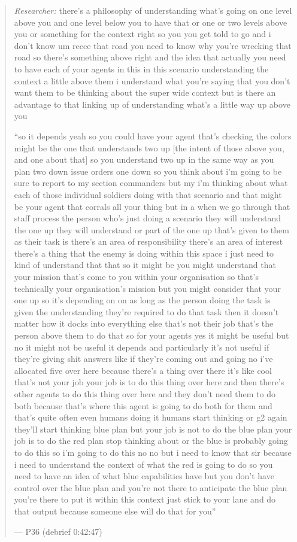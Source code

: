 \begin{quote}\small
{\footnotesize\textit{Researcher:} there's a philosophy of understanding what's going on one level above you and one level below you to have that or one or two levels above you or something for the context right so you you get told to go and i don't know um recce that road you need to know why you're wrecking that road so there's something above right and the idea that actually you need to have each of your agents in this in this scenario understanding the context a little above them i understand what you're saying that you don't want them to be thinking about the super wide context but is there an advantage to that linking up of understanding what's a little way up above you}\par\smallskip
``so it depends yeah so you could have your agent that's checking the colors might be the one that understands two up [the intent of those above you, and one about that] so you understand two up in the same way as you plan two down issue orders one down so you think about i'm going to be sure to report to my section commanders but my i'm thinking about what each of those individual soldiers doing with that scenario and that might be your agent that corrals all your thing but in a when we go through that staff process the person who's just doing a scenario they will understand the one up they will understand or part of the one up that's given to them as their task is there's an area of responsibility there's an area of interest there's a thing that the enemy is doing within this space i just need to kind of understand that that so it might be you might understand that your mission that's come to you within your organisation so that's technically your organisation's mission but you might consider that your one up so it's depending on on as long as the person doing the task is given the understanding they're required to do that task then it doesn't matter how it docks into everything else that's not their job that's the person above them to do that so for your agents yes it might be useful but no it might not be useful it depends and particularly it's not useful if they're giving shit answers like if they're coming out and going no i've allocated five over here because there's a thing over there it's like cool that's not your job your job is to do this thing over here and then there's other agents to do this thing over here and they don't need them to do both because that's where this agent is going to do both for them and that's quite often even humans doing it humans start thinking or g2 again they'll start thinking blue plan but your job is not to do the blue plan your job is to do the red plan stop thinking about or the blue is probably going to do this so i'm going to do this no no but i need to know that sir because i need to understand the context of what the red is going to do so you need to have an idea of what blue capabilities have but you don't have control over the blue plan and you're not there to anticipate the blue plan you're there to put it within this context just stick to your lane and do that output because someone else will do that for you''\par\hfill--- P36 (debrief 0:42:47)
\end{quote}

